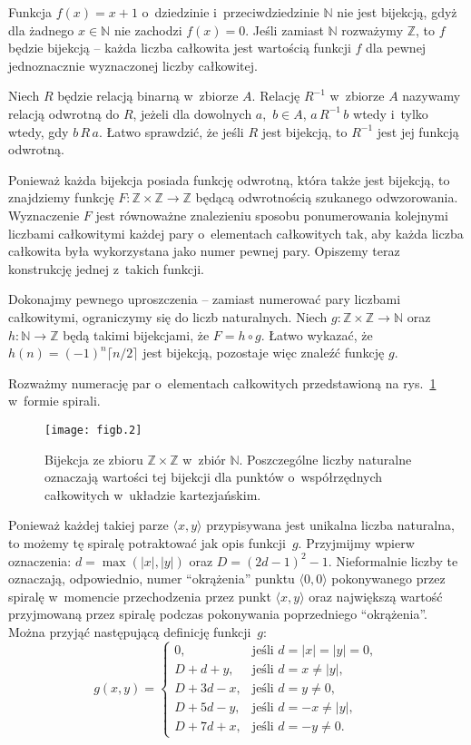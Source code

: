 \exercise %
Funkcja $f(x)=x+1$ o~dziedzinie i~przeciwdziedzinie $\mathbb{N}$ nie jest bijekcją, gdyż dla żadnego $x\in\mathbb{N}$ nie zachodzi $f(x)=0$. Jeśli zamiast $\mathbb{N}$ rozważymy $\mathbb{Z}$, to $f$ będzie bijekcją -- każda liczba całkowita jest wartością funkcji $f$ dla pewnej jednoznacznie wyznaczonej liczby całkowitej.

\exercise %
Niech $R$ będzie relacją binarną w~zbiorze $A$. Relację $R^{-1}$ w~zbiorze $A$ nazywamy relacją odwrotną do $R$, jeżeli dla dowolnych $a$,~$b\in A$, $a\,R^{-1}\,b$ wtedy i~tylko wtedy, gdy $b\,R\,a$. Łatwo sprawdzić, że jeśli $R$ jest bijekcją, to $R^{-1}$ jest jej funkcją odwrotną.

\exercise %
Ponieważ każda bijekcja posiada funkcję odwrotną, która także jest bijekcją, to znajdziemy funkcję $F\colon\mathbb{Z}\times\mathbb{Z}\to\mathbb{Z}$ będącą odwrotnością szukanego odwzorowania. Wyznaczenie $F$ jest równoważne znalezieniu sposobu ponumerowania kolejnymi liczbami całkowitymi każdej pary o~elementach całkowitych tak, aby każda liczba całkowita była wykorzystana jako numer pewnej pary. Opiszemy teraz konstrukcję jednej z~takich funkcji.

Dokonajmy pewnego uproszczenia -- zamiast numerować pary liczbami całkowitymi, ograniczymy się do liczb naturalnych. Niech $g\colon\mathbb{Z}\times\mathbb{Z}\to\mathbb{N}$ oraz $h\colon\mathbb{N}\to\mathbb{Z}$ będą takimi bijekcjami, że $F=h\circ g$. Łatwo wykazać, że $h(n)=(-1)^n\lceil n/2\rceil$ jest bijekcją, pozostaje więc znaleźć funkcję $g$.

Rozważmy numerację par o~elementach całkowitych przedstawioną na rys.~\ref{fig:B.3-4} w~formie spirali.
\begin{figure}[ht]
	\begin{center}
		\texttt{[image: figb.2]}
	\end{center}
	\caption{Bijekcja ze zbioru $\mathbb{Z}\times\mathbb{Z}$ w~zbiór $\mathbb{N}$. Poszczególne liczby naturalne oznaczają wartości tej bijekcji dla punktów o~współrzędnych całkowitych w~układzie kartezjańskim.} \label{fig:B.3-4}
\end{figure}
Ponieważ każdej takiej parze $\langle x,y\rangle$ przypisywana jest unikalna liczba naturalna, to możemy tę spiralę potraktować jak opis funkcji~$g$. Przyjmijmy wpierw oznaczenia: $d=\max(|x|,|y|)$ oraz $D=(2d-1)^2-1$. Nieformalnie liczby te oznaczają, odpowiednio, numer ``okrążenia'' punktu $\langle0,0\rangle$ pokonywanego przez spiralę w~momencie przechodzenia przez punkt $\langle x,y\rangle$ oraz największą wartość przyjmowaną przez spiralę podczas pokonywania poprzedniego ``okrążenia''. Można przyjąć następującą definicję funkcji~$g$:
\[
	g(x,y) =
	\begin{cases}
		0, & \text{jeśli $d=|x|=|y|=0$}, \\
		D+d+y, & \text{jeśli $d=x\ne|y|$}, \\
		D+3d-x, & \text{jeśli $d=y\ne0$}, \\
		D+5d-y, & \text{jeśli $d=-x\ne|y|$}, \\
		D+7d+x, & \text{jeśli $d=-y\ne0$}.
	\end{cases}
\]

